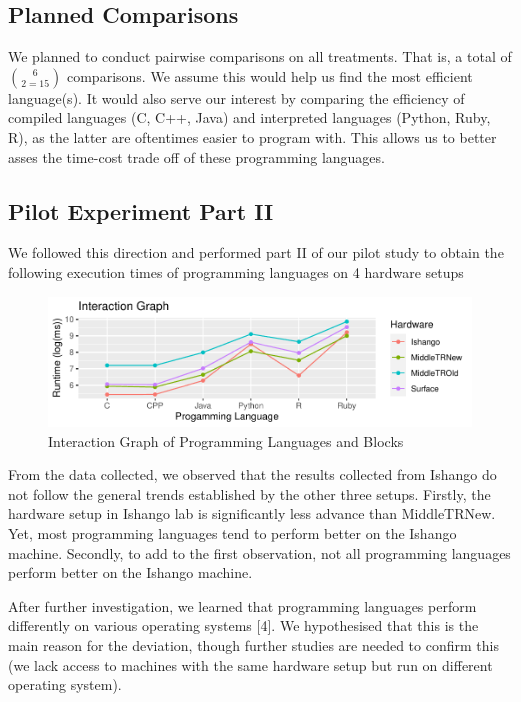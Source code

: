 \documentclass[12pt,halfline,a4paper,]{ouparticle}
\begin{document}
\hypertarget{planned-comparisons}{%
\subsection{Planned Comparisons}\label{planned-comparisons}}

We planned to conduct pairwise comparisons on all treatments. That is, a
total of \(6 \choose 2 = 15\) comparisons. We assume this would help us
find the most efficient language(s). It would also serve our interest by
comparing the efficiency of compiled languages (C, C++, Java) and
interpreted languages (Python, Ruby, R), as the latter are oftentimes
easier to program with. This allows us to better asses the time-cost
trade off of these programming languages.

\hypertarget{pilot-experiment-part-ii}{%
\subsection{Pilot Experiment Part II}\label{pilot-experiment-part-ii}}

We followed this direction and performed part II of our pilot study to
obtain the following execution times of programming languages on 4
hardware setups

\begin{figure}[H]
\includegraphics[width=1\linewidth]{backup_files/figure-latex/figPilot-1} \caption{Interaction Graph of Programming Languages and Blocks}\label{fig:figPilot}
\end{figure}

From the data collected, we observed that the results collected from
Ishango do not follow the general trends established by the other three
setups. Firstly, the hardware setup in Ishango lab is significantly less
advance than MiddleTRNew. Yet, most programming languages tend to
perform better on the Ishango machine. Secondly, to add to the first
observation, not all programming languages perform better on the Ishango
machine.

After further investigation, we learned that programming languages
perform differently on various operating systems {[}4{]}. We
hypothesised that this is the main reason for the deviation, though
further studies are needed to confirm this (we lack access to machines
with the same hardware setup but run on different operating system).
\end{document}
